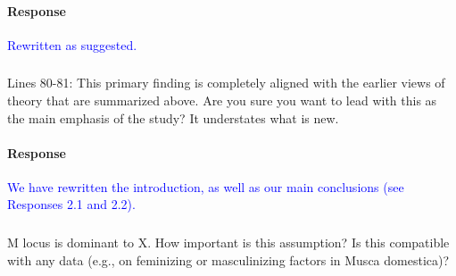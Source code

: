 \documentclass[10pt,letterpaper]{article}
\begin{document}
\noindent\paragraph{Response}
\textcolor{blue}{Rewritten as suggested.}

\noindent\subsubsection{}
Lines 80-81: This primary finding is completely aligned with the earlier views of theory that are summarized above. Are you sure you want to lead with this as the main emphasis of the study? It understates what is new.

\noindent\paragraph{Response}
\textcolor{blue}{We have rewritten the introduction, as well as our main conclusions (see Responses 2.1 and 2.2).}

\noindent\subsubsection{}
M locus is dominant to X. How important is this assumption? Is this compatible with any data (e.g., on feminizing or masculinizing factors in Musca domestica)?
\end{document}

